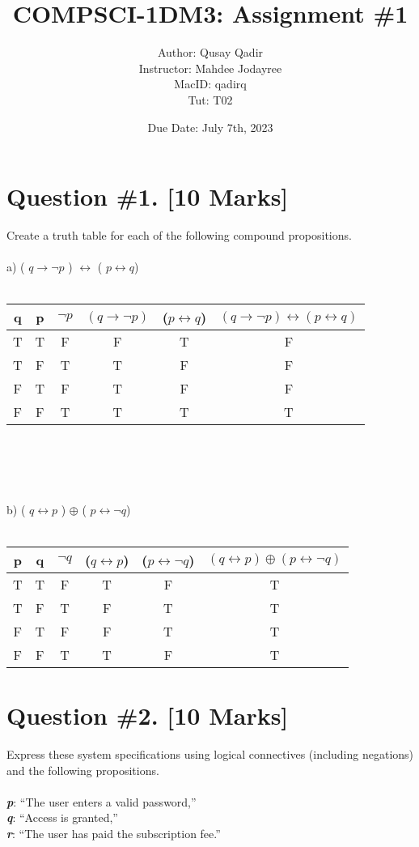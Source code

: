 \documentclass{article}
\title{
\LARGE COMPSCI-1DM3: Assignment \#1 \\
}
\author{\Large Author: Qusay Qadir \\
\large Instructor: Mahdee Jodayree \\ MacID: qadirq \\Tut: T02 \\ }
\date{Due Date: July 7th, 2023}
\begin{document}
\maketitle
\newpage
\tableofcontents
\newpage
\section{Question \#1. [10 Marks]}
Create a truth table for each of the following compound propositions. \\ \\ 
a) ( $q \rightarrow \neg p$ )  $\leftrightarrow$ ( $p \leftrightarrow q$) \\ \\
\begin{table}[h]
\centering
\begin{tabular}{cccccc}
\hline
q & p & $\neg p$ & $(q \rightarrow \neg p)$ & ($p \leftrightarrow q$) & $(q \rightarrow \neg p) \leftrightarrow (p \leftrightarrow q)$ \\ 
\hline
T & T & F & F & T & F \\
T & F & T & T & F & F \\
F & T & F & T & F & F \\
F & F & T & T & T & T \\
\hline
\end{tabular}
\end{table}
\\ \\ \\ \\ 
b)  ( $q \leftrightarrow p$ )  $\oplus$ ( $p \leftrightarrow \neg q$) \\ \\ 
\begin{table}[h]
\centering
\begin{tabular}{cccccc}
\hline
p & q & $\neg q$& ($q \leftrightarrow p$) & ($p \leftrightarrow \neg q$) & $(q \leftrightarrow p) \oplus (p \leftrightarrow \neg q)$ \\
\hline
T & T & F  & T & F & T \\
T & F & T  & F & T & T  \\
F & T & F  & F & T & T \\
F & F & T  & T & F & T \\
\hline
\end{tabular}
\end{table}

\newpage
\section{Question \#2. [10 Marks]}
Express these system specifications using logical connectives (including negations) and the following propositions.
\\\\
\textit{\textbf p}: “The user enters a valid password,” \\
\textit{\textbf q}: “Access is granted,” \\
\textit{\textbf r}: “The user has paid the subscription fee.” \\ \\ 
\end{document}
